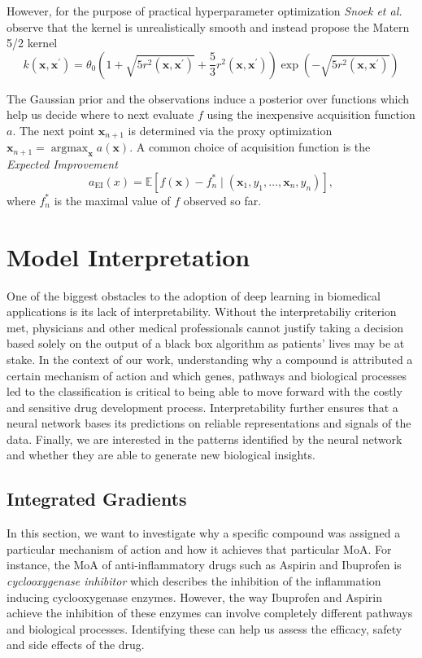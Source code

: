\documentclass[bsc,frontabs,twoside,singlespacing,parskip,deptreport]{infthesis}     %
\let\Oldsection\section
\renewcommand{\section}{\FloatBarrier\Oldsection}
\let\Oldsubsection\subsection
\renewcommand{\subsection}{\FloatBarrier\Oldsubsection}
\begin{document}
However, for the purpose of practical hyperparameter optimization \textit{Snoek et al.} \cite{snoek_practical_nodate} observe that the kernel is unrealistically smooth and instead propose the Matern 5/2 kernel 
\[k\left(\mathbf{x}, \mathbf{x}^{\prime}\right)=\theta_{0}\left(1+\sqrt{5 r^{2}\left(\mathbf{x}, \mathbf{x}^{\prime}\right)}+\frac{5}{3} r^{2}\left(\mathbf{x}, \mathbf{x}^{\prime}\right)\right) \exp \left(-\sqrt{5 r^{2}\left(\mathbf{x}, \mathbf{x}^{\prime}\right)}\right)\]

The Gaussian prior and the observations induce a posterior over functions which help us decide where to next evaluate \(f\) using the inexpensive acquisition function \(a\). The next point \(\mathbf{x}_{n+1}\) is determined via the proxy optimization  \(\mathbf{x}_{n+1}=\operatorname{argmax}_{\mathbf{x}} a(\mathbf{x})\).
A common choice of acquisition function is the \textit{Expected Improvement}
\[
a_{\mathrm{EI}}(x)=\mathbb{E}[f(\mathbf{x})-f_{n}^{*} \mid\left(\mathbf{x}_{1}, y_{1}, \ldots, \mathbf{x}_{n}, y_{n}\right)],
\] where \(f_{n}^{*}\) is the maximal value of \(f\) observed so far.

\section{Model Interpretation}
One of the biggest obstacles to the adoption of deep learning in biomedical applications is its lack of interpretability. Without the interpretabiliy criterion met, physicians and other medical professionals cannot justify taking a decision based solely on the output of a black box algorithm as patients' lives may be at stake. In the context of our work, understanding why a compound is attributed a certain mechanism of action and which genes, pathways and biological processes led to the classification is critical to being able to move forward with the costly and sensitive drug development process. Interpretability further ensures that a neural network bases its predictions on reliable representations and signals of the data. Finally, we are interested in the patterns identified by the neural network and whether they are able to generate new biological insights.

\subsection{Integrated Gradients}
In this section, we want to investigate why a specific compound was assigned a particular mechanism of action and how it achieves that particular MoA.
For instance, the MoA of anti-inflammatory drugs such as Aspirin and Ibuprofen is \textit{cyclooxygenase inhibitor} which describes the inhibition of the inflammation inducing cyclooxygenase enzymes. However, the way Ibuprofen and Aspirin achieve the inhibition of these enzymes can involve completely different pathways and biological processes. Identifying these can help us assess the efficacy, safety and side effects of the drug.
\end{document}
